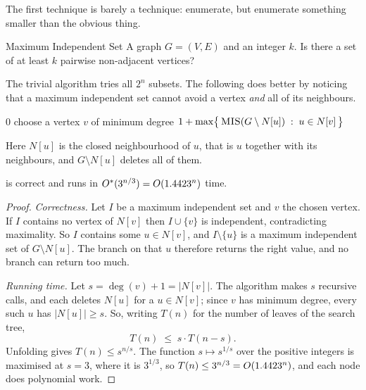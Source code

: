 The first technique is barely a technique: enumerate, but enumerate something
smaller than the obvious thing.

\begin{probdef}{Maximum Independent Set}
  \instance A graph $G = (V,E)$ and an integer $k$.
  \question Is there a set of at least $k$ pairwise non-adjacent vertices?
\end{probdef}

The trivial algorithm tries all $2^n$ subsets. The following does better by
noticing that a maximum independent set cannot avoid a vertex \emph{and} all of
its neighbours.

\begin{algorithm}[ht]
\caption{Enumeration for }
\label{alg:exact-mis-enum}
\begin{algorithmic}[1]
     \Return $0$ \EndIf
    \State choose a vertex $v$ of minimum degree
    \State \Return $1 + \max\bigl\{\, \Call{MIS}{G \setminus N[u]} \;:\;
           u \in N[v] \,\bigr\}$
  \EndFunction
\end{algorithmic}
\end{algorithm}

Here $N[u]$ is the closed neighbourhood of $u$, that is $u$ together with its
neighbours, and $G \setminus N[u]$ deletes all of them.

\begin{theorem}\label{thm:mis-enumeration}
 is correct and runs in $O^{*}(3^{n/3}) =
O\!\left(1.4423^n\right)$ time.
\end{theorem}

\begin{proof}
\emph{Correctness.} Let $I$ be a maximum independent set and $v$ the chosen
vertex. If $I$ contains no vertex of $N[v]$ then $I \cup \{v\}$ is independent,
contradicting maximality. So $I$ contains some $u \in N[v]$, and
$I \setminus \{u\}$ is a maximum independent set of $G \setminus N[u]$. The
branch on that $u$ therefore returns the right value, and no branch can return
too much.

\emph{Running time.} Let $s = \deg(v)+1 = |N[v]|$. The algorithm makes $s$
recursive calls, and each deletes $N[u]$ for a $u \in N[v]$; since $v$ has
minimum degree, every such $u$ has $|N[u]| \ge s$. So, writing $T(n)$ for the
number of leaves of the search tree,
\[ T(n) \;\le\; s \cdot T(n-s). \]
Unfolding gives $T(n) \le s^{n/s}$. The function $s \mapsto s^{1/s}$ over the
positive integers is maximised at $s = 3$, where it is $3^{1/3}$, so
$T(n) \le 3^{n/3} = O\!\left(1.4423^n\right)$, and each node does polynomial work.
\end{proof}

